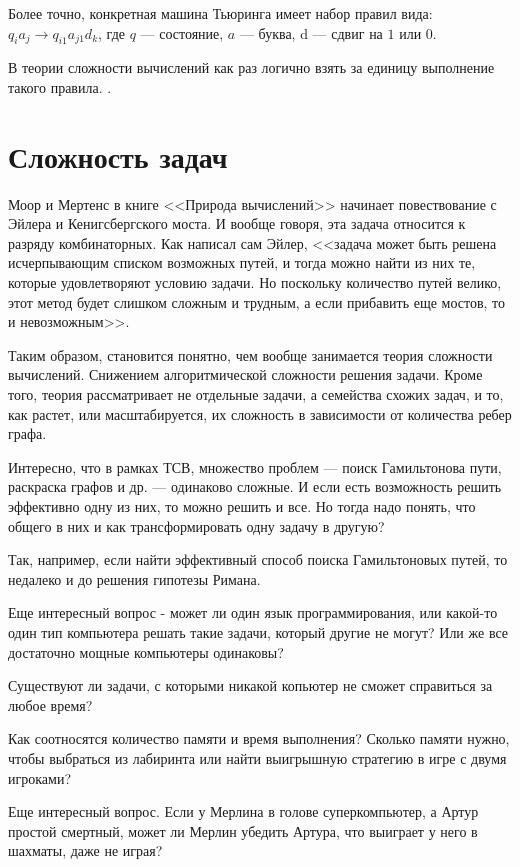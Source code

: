 \documentclass{article}
\begin{document}
Более точно, конкретная машина Тьюринга имеет набор правил вида: 
${q_i}{a_j}\to {q_{i1}}{a_{j1}}{d_k}$, 
где $q$ --- состояние, $a$ --- буква, d --- сдвиг на $1$ или $0$.

В теории сложности вычислений как раз логично взять за единицу выполнение такого правила.
\cite{wikituring}.

\section{Сложность задач}
Моор и Мертенс в книге <<Природа вычислений>>\cite{moore} начинает повествование с Эйлера и Кенигсбергского моста.
И вообще говоря, эта задача относится к разряду комбинаторных. Как написал сам Эйлер, <<задача может быть решена исчерпывающим списком возможных путей, и тогда можно найти из них те, которые удовлетворяют условию задачи. Но поскольку количество путей велико, этот метод будет слишком сложным и трудным, а если прибавить еще мостов, то и невозможным>>.

Таким образом, становится понятно, чем вообще занимается теория сложности вычислений. Снижением алгоритмической сложности решения задачи. Кроме того, теория рассматривает не отдельные задачи, а семейства схожих задач, и то, как растет, или масштабируется, их сложность  в зависимости от количества ребер графа.

Интересно, что в рамках ТСВ, множество проблем --- поиск Гамильтонова пути, раскраска графов и др. --- одинаково сложные. И если есть возможность решить эффективно одну из них, то можно решить и все. Но тогда надо понять, что общего в них и как трансформировать одну задачу в другую?

Так, например, если найти эффективный способ поиска Гамильтоновых путей, то недалеко и до решения гипотезы Римана.

Еще интересный вопрос - может ли один язык программирования, или какой-то один тип компьютера решать такие задачи, который другие не могут? Или же все достаточно мощные компьютеры одинаковы? 

Существуют ли задачи, с которыми никакой копьютер не сможет справиться за любое время?

Как соотносятся количество памяти и время выполнения? Сколько памяти нужно, чтобы выбраться из лабиринта или найти выигрышную стратегию в игре с двумя игроками?

Еще интересный вопрос. Если у Мерлина в голове суперкомпьютер, а Артур простой смертный, может ли Мерлин убедить Артура, что выиграет у него в шахматы, даже не играя?
\end{document}
